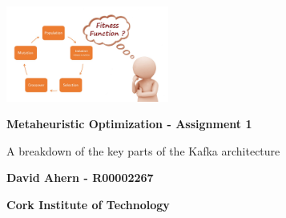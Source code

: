 \begin{titlepage}
    \begin{center}
    	\includegraphics[width=0.4\textwidth]{images/cover.jpeg}
    	
        \vspace*{1cm}
        
        \textbf{Metaheuristic Optimization - Assignment 1}
        
        \vspace{0.5cm}
        A breakdown of the key parts of the Kafka architecture
        
        \vspace{1.5cm}
        
        \textbf{David Ahern - R00002267}
        
        \vspace{0.5cm}
        \textbf{Cork Institute of Technology}
        
    \end{center}
\end{titlepage}